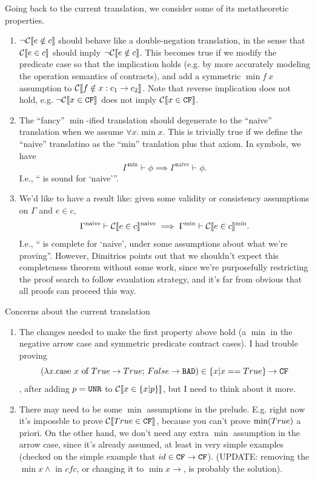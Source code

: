 \documentclass[preprint]{sigplanconf}
\begin{document}
{Going back to the current translation, we consider some of its
metatheoretic properties.
\protect \begin{enumerate}
\item $\lnot \mathcal{C} \llbracket e \notin c \rrbracket$ should behave like a double-negation
  translation, in the sense that $\mathcal{C} \llbracket e \in c \rrbracket$ should imply
  $\lnot \mathcal{C} \llbracket e \notin c \rrbracket$.  This becomes true if we modify the
  predicate case so that the implication holds (e.g. by more accurately
  modeling the operation semantics of contracts), and add a symmetric 
  $\min{f ~x}$ assumption to $\mathcal{C} \llbracket f \notin x:c_1 \to c_2 \rrbracket$.  Note that
  reverse implication does not hold, e.g. $\lnot \mathcal{C} \llbracket x \in \texttt{CF} \rrbracket$ does
  not imply $\mathcal{C} \llbracket x \in \texttt{CF} \rrbracket$.
\item The ``fancy'' $\min{}$-ified translation should 
  degenerate to the ``naive'' translation when we assume $\forall x. \min{x}$.
  This is trivially true if we define the ``naive'' translatino as the ``min'' tranlation
  plus that axiom.  In symbols, we have
  \protect \[
  \Gamma^\text{min} \vdash \phi \implies \Gamma^\text{naive} \vdash \phi.
  \]  I.e., ``\min{} is sound for `naive'''.
\item We'd like to have a result  like: given some validity or consistency 
  assumptions on $\Gamma$ and $e \in c$,
  \protect \[
    \Gamma^\text{naive} \vdash \mathcal{C} \llbracket e \in c \rrbracket^\text{naive} \implies \Gamma^\text{min} \vdash \mathcal{C} \llbracket e \in c \rrbracket^\text{min}.
  \]  I.e., ``\min{} is complete for `naive', under some assumptions about 
  what we're proving''.  However, Dimitrios points out that we shouldn't expect this
  completeness theorem without some work, since we're purposefully 
  restricting the proof search to follow
  evaulation strategy, and it's far from obvious that all proofs can proceed this way.

\end{enumerate}

Concerns about the current translation
\protect \begin{enumerate}
\item The changes needed to make the first property above hold (a $\min{}$ in the negative
  arrow case and symmetric predicate contract cases).
  I had trouble proving
  \protect \[
  (\lambda x. \text{case $x$ of $True \to True$; $False \to \texttt{BAD}$})
  \in \{x|x==True\} \to \texttt{CF}
  \]
  , after adding $p = \texttt{UNR}$ to $\mathcal{C} \llbracket x \in \{x|p\} \rrbracket$, but I need to think about it more.

\item There may need to be some $\min{}$ assumptions in the prelude.  E.g. right now 
  it's impossble to prove $\mathcal{C} \llbracket True \in \texttt{CF} \rrbracket$, because you can't prove
  $\mbox{min}(True)$ a priori.  On the other hand, we don't need any extra
  $\min{}$ assumption in the arrow case, since it's already assumed, at least in
  very simple examples (checked on the simple
  example that $id \in \texttt{CF} \to \texttt{CF}$). (UPDATE: removing the $\min{x} \land$ in $cfc$, 
  or changing it to $\min{x} \to$, is probably the solution).


\end{enumerate}}
\end{document}
